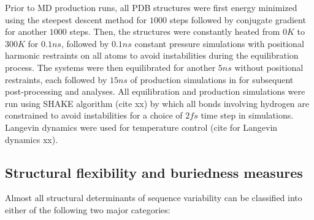 \documentclass[12pt]{article}
\begin{document}
        Prior to MD production runs, all PDB structures were first energy minimized using the steepest descent method for $1000$ steps followed by conjugate gradient for another $1000$ steps. Then, the structures were constantly heated from $0K$ to $300K$ for $0.1ns$, followed by $0.1ns$ constant pressure simulations with positional harmonic restraints on all atoms to avoid instabilities during the equilibration process. The systems were then equilibrated for another $5ns$ without positional restraints, each followed by $15ns$ of production simulations in for subsequent post-processing and analyses. All equilibration and production simulations were run using SHAKE algorithm (cite xx) by which all bonds involving hydrogen are constrained to avoid instabilities for a choice of $2fs$ time step in simulations. Langevin dynamics were used for temperature control (cite for Langevin dynamics xx).

\subsection*{Structural flexibility and buriedness measures}

        Almost all structural determinants of sequence variability can be classified into either of the following two major categories:
\end{document}
